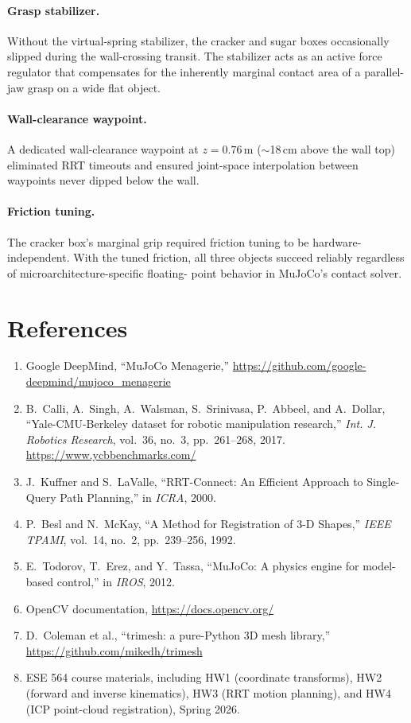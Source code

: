 \documentclass[11pt]{article}
\begin{document}
\paragraph{Grasp stabilizer.}
Without the virtual-spring stabilizer, the cracker and sugar boxes
occasionally slipped during the wall-crossing transit. The stabilizer
acts as an active force regulator that compensates for the inherently
marginal contact area of a parallel-jaw grasp on a wide flat object.

\paragraph{Wall-clearance waypoint.}
A dedicated wall-clearance waypoint at $z = 0.76$\,m
($\sim$18\,cm above the wall top) eliminated RRT timeouts and ensured
joint-space interpolation between waypoints never dipped below the wall.

\paragraph{Friction tuning.}
The cracker box's marginal grip required friction tuning to be
hardware-independent. With the tuned friction, all three objects
succeed reliably regardless of microarchitecture-specific floating-
point behavior in MuJoCo's contact solver.

\section{References}

\begin{enumerate}[nosep]
\item Google DeepMind, ``MuJoCo Menagerie,''
\url{https://github.com/google-deepmind/mujoco_menagerie}
\item B.~Calli, A.~Singh, A.~Walsman, S.~Srinivasa, P.~Abbeel, and
A.~Dollar, ``Yale-CMU-Berkeley dataset for robotic manipulation
research,'' \emph{Int. J. Robotics Research}, vol.~36, no.~3,
pp.~261--268, 2017. \url{https://www.ycbbenchmarks.com/}
\item J.~Kuffner and S.~LaValle, ``RRT-Connect: An Efficient Approach
to Single-Query Path Planning,'' in \emph{ICRA}, 2000.
\item P.~Besl and N.~McKay, ``A Method for Registration of 3-D Shapes,''
\emph{IEEE TPAMI}, vol.~14, no.~2, pp.~239--256, 1992.
\item E.~Todorov, T.~Erez, and Y.~Tassa, ``MuJoCo: A physics engine for
model-based control,'' in \emph{IROS}, 2012.
\item OpenCV documentation, \url{https://docs.opencv.org/}
\item D.~Coleman et al., ``trimesh: a pure-Python 3D mesh library,''
\url{https://github.com/mikedh/trimesh}
\item ESE 564 course materials, including HW1 (coordinate transforms),
HW2 (forward and inverse kinematics), HW3 (RRT motion planning), and
HW4 (ICP point-cloud registration), Spring 2026.
\end{enumerate}
\end{document}
